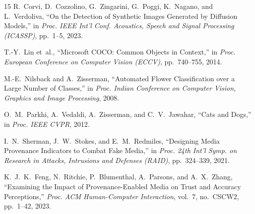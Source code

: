 \documentclass[conference]{IEEEtran}
\begin{document}
\begin{thebibliography}{15}
  R.~Corvi, D.~Cozzolino, G.~Zingarini, G.~Poggi, K.~Nagano,
  and L.~Verdoliva,
  ``On the Detection of Synthetic Images Generated by Diffusion
  Models,''
  in \emph{Proc. IEEE Int'l Conf. Acoustics, Speech and Signal
  Processing (ICASSP)}, pp.~1--5, 2023.

  T.-Y.~Lin et~al.,
  ``Microsoft COCO: Common Objects in Context,''
  in \emph{Proc. European Conference on Computer Vision (ECCV)},
  pp.~740--755, 2014.

  M.-E.~Nilsback and A.~Zisserman,
  ``Automated Flower Classification over a Large Number of Classes,''
  in \emph{Proc. Indian Conference on Computer Vision, Graphics and
  Image Processing}, 2008.

  O.~M.~Parkhi, A.~Vedaldi, A.~Zisserman, and C.~V.~Jawahar,
  ``Cats and Dogs,''
  in \emph{Proc. IEEE CVPR}, 2012.

  I.~N.~Sherman, J.~W.~Stokes, and E.~M.~Redmiles,
  ``Designing Media Provenance Indicators to Combat Fake Media,''
  in \emph{Proc. 24th Int'l Symp. on Research in Attacks, Intrusions
  and Defenses (RAID)}, pp.~324--339, 2021.

  K.~J.~K.~Feng, N.~Ritchie, P.~Blumenthal, A.~Parsons,
  and A.~X.~Zhang,
  ``Examining the Impact of Provenance-Enabled Media on Trust and
  Accuracy Perceptions,''
  \emph{Proc. ACM Human-Computer Interaction},
  vol.~7, no.~CSCW2, pp.~1--42, 2023.

\end{thebibliography}
\end{document}
